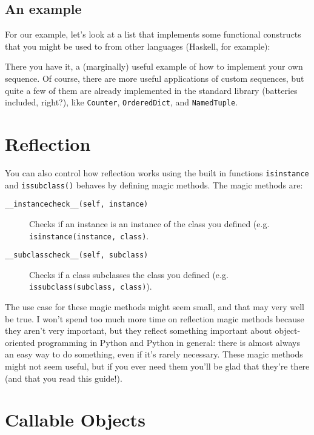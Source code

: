 \documentclass[a4paper,11pt]{article}
\newcommand{\code}[1]{\texttt{#1}}
\begin{document}
\subsection{An example}


For our example, let's look at a list that implements some functional constructs that you might be used to from other languages (Haskell, for example):



\noindent
There you have it, a (marginally) useful example of how to implement your own sequence. Of course, there are more useful applications of custom sequences, but quite a few of them are already implemented in the standard library (batteries included, right?), like \code{Counter}, \code{OrderedDict}, and \code{NamedTuple}.

\section{Reflection}

You can also control how reflection works using the built in functions \code{isinstance} and \code{issubclass()} behaves by defining magic methods. The magic methods are:

\begin{description}

\item[\code{__instancecheck__(self, instance)}]
Checks if an instance is an instance of the class you defined (e.g. \code{isinstance(instance, class)}.
\item[\code{__subclasscheck__(self, subclass)}]
Checks if a class subclasses the class you defined (e.g. \code{issubclass(subclass, class)}).

\end{description}

The use case for these magic methods might seem small, and that may very well be true. I won't spend too much more time on reflection magic methods because they aren't very important, but they reflect something important about object-oriented programming in Python and Python in general: there is almost always an easy way to do something, even if it's rarely necessary. These magic methods might not seem useful, but if you ever need them you'll be glad that they're there (and that you read this guide!).

\section{Callable Objects}
\end{document}
